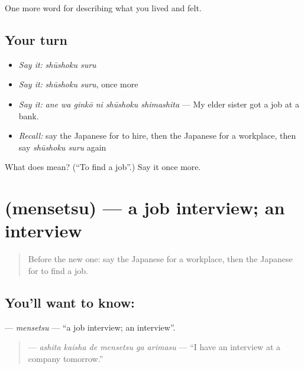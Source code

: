 \begin{grammarlens}[title={What you've built}]
One more word for describing what you lived and felt.
\end{grammarlens}

\subsection*{Your turn}
\begin{itemize}
\raggedright
  \item \emph{Say it:} \emph{shūshoku suru}
  \item \emph{Say it:} \emph{shūshoku suru}, once more
  \item \emph{Say it:} \emph{ane wa ginkō ni shūshoku shimashita} — My elder sister got a job at a bank.
  \item \emph{Recall:} say the Japanese for to hire, then the Japanese for a workplace, then say \emph{shūshoku suru} again
\end{itemize}

\begin{tcolorbox}[breakable,colback=teal!4,colframe=teal!35!black,title={Before you move on}]
What does  mean? (\textquotedblleft{}To find a job\textquotedblright{}.) Say it once more.
\end{tcolorbox}
\section[\texorpdfstring{\ja{めんせつ} (mensetsu)}{めんせつ (mensetsu)}]{ (mensetsu) — a job interview; an interview}

\label{lesson:JA-C457-mensetsu}



\begin{quote}
Before the new one: say the Japanese for a workplace, then the Japanese for to find a job.
\end{quote}

\subsection*{You'll want to know: }
\textbf{} — \emph{mensetsu} — \textquotedblleft{}a job interview; an interview\textquotedblright{}.

\begin{quote}
\textbf{   } — \emph{ashita kaisha de mensetsu ga arimasu} — \textquotedblleft{}I have an interview at a company tomorrow.\textquotedblright{}
\end{quote}

